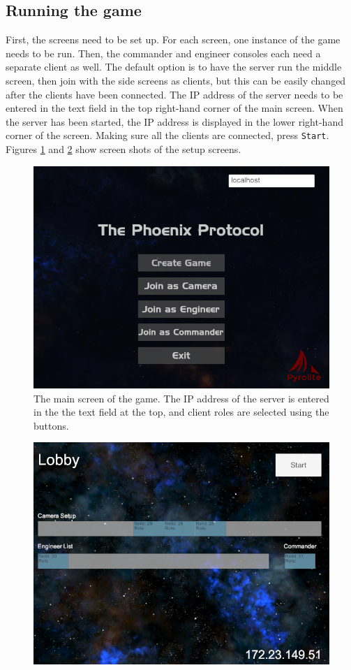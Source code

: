 \documentclass[a4paper,11pt]{article}
\begin{document}
\subsection{Running the game}

First, the screens need to be set up. For each screen, one instance of the game needs to be run. Then, the commander and engineer consoles each need a separate client as well. The default option is to have the server run the middle screen, then join with the side screens as clients, but this can be easily changed after the clients have been connected. The IP address of the server needs to be entered in the text field in the top right-hand corner of the main screen. When the server has been started, the IP address is displayed in the lower right-hand corner of the screen. Making sure all the clients are connected, press \texttt{Start}. Figures \ref{fig:first_screen} and \ref{fig:lobby_screen} show screen shots of the setup screens.

\begin{figure}[ht]
	\centering
    \includegraphics[width=.7\textwidth]{game_first_screen}
    \caption{The main screen of the game. The IP address of the server is entered in the the text field at the top, and client roles are selected using the buttons.}
    \label{fig:first_screen}
\end{figure}

\begin{figure}[ht]
  \centering
  \includegraphics[width=.7\textwidth]{game_lobby_screen}
  \label{fig:lobby_screen}
\end{figure}
\end{document}
